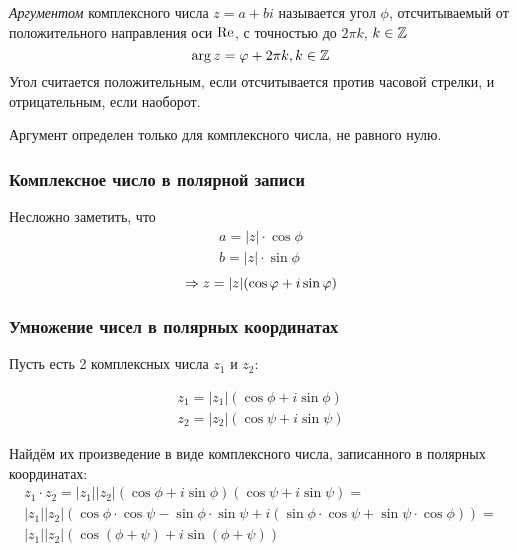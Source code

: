 \begin{definition}
    \textit{Аргументом} комплексного числа $z = a + bi$ называется угол $\phi$, отсчитываемый от положительного направления оси $\operatorname{Re}$, с точностью до $2\pi k$, $k \in \mathbb{Z}$
    $$
        \arg z = \varphi + 2\pi k, k \in \mathbb{Z}
    $$
    Угол считается положительным, если отсчитывается против часовой стрелки, и отрицательным, если наоборот.
\end{definition}

\begin{note}
    Аргумент определен только для комплексного числа, не равного нулю.
\end{note}

\subsubsection{Комплексное число в полярной записи}

\begin{definition}
    Несложно заметить, что
    \begin{align*}
        a = |z| \cdot \cos \phi \\
        b = |z| \cdot \sin \phi
    \end{align*}
    $$
        \Rightarrow z = |z|(\cos \varphi + i \sin \varphi)
    $$
\end{definition}

\subsubsection{Умножение чисел в полярных координатах}

Пусть есть 2 комплексных числа $z_1$ и $z_2$:

\begin{align*}
    z_1 = |z_1|(\cos\phi + i \sin\phi)
    \\
    z_2 = |z_2|(\cos\psi + i \sin\psi)
\end{align*}

Найдём их произведение в виде комплексного числа, записанного в полярных координатах:
\begin{multline}
    z_1 \cdot z_2 = |z_1||z_2|(\cos\phi + i \sin\phi)(\cos\psi + i \sin\psi) = \\
    |z_1||z_2|(\cos\phi \cdot \cos\psi - \sin\phi \cdot \sin\psi + i(\sin\phi \cdot \cos\psi + \sin\psi \cdot \cos\phi)) = \\
    |z_1||z_2|(\cos(\phi + \psi) + i \sin(\phi + \psi))
\end{multline}

